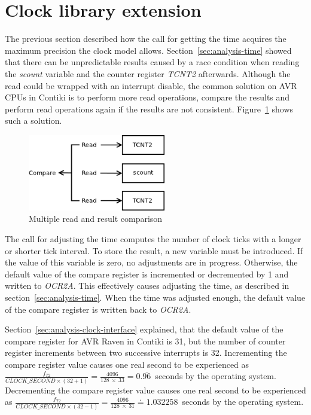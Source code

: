 
\section{Clock library extension}\label{sec:design-clock}
The previous section described how the call for getting the time acquires
the maximum precision the clock model allows.
Section~\ref{sec:analysis-time} showed that there can be unpredictable
results caused by a race condition when reading the {\it{scount}} variable
and the counter register {\it{TCNT2}} afterwards.
Although the read could be wrapped with an interrupt disable,
the common solution on AVR CPUs in Contiki is to perform more read operations,
compare the results and perform read operations again if the results are not consistent.
Figure~\ref{fig:design-read} shows such a solution.

\begin{figure}
  \centering
  \includegraphics[width=6cm,keepaspectratio]{fig/read.png}
  \caption{Multiple read and result comparison}
  \label{fig:design-read}
\end{figure}

The call for adjusting the time computes the number of clock ticks
with a longer or shorter tick interval.
To store the result, a new variable must be introduced.
If the value of this variable is zero, no adjustments are in progress.
Otherwise, the default value of the compare register is incremented or decremented by 1
and written to {\it{OCR2A}}.
This effectively causes adjusting the time, as described in section~\ref{sec:analysis-time}.
When the time was adjusted enough,
the default value of the compare register is written back to {\it{OCR2A}}.

Section~\ref{sec:analysis-clock-interface} explained, that the default value
of the compare register for AVR Raven in Contiki is 31,
but the number of counter register increments between two successive interrupts is 32.
Incrementing the compare register value causes one real second to be experienced as
$\frac{f_{T2}}{CLOCK\_SECOND \times (32 + 1)} = \frac{4096}{128~\times~33} = 0.\overline{96}$~seconds
by the operating system.
Decrementing the compare register value causes one real second to be experienced as
$\frac{f_{T2}}{CLOCK\_SECOND \times (32 - 1)} = \frac{4096}{128~\times~31} \doteq 1.032258$~seconds
by the operating system.

